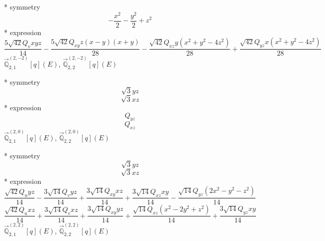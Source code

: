 \documentclass[fleqn,8pt]{jsarticle}
\begin{document}
\noindent\quad ** symmetry
\begin{dmath*}
- \frac{x^{2}}{2} - \frac{y^{2}}{2} + z^{2}
\end{dmath*}
\noindent\quad ** expression
\begin{dmath*}
\frac{5 \sqrt{42} Q_{v} x y z}{14} - \frac{5 \sqrt{42} Q_{xy} z \left(x - y\right) \left(x + y\right)}{28} - \frac{\sqrt{42} Q_{xz} y \left(x^{2} + y^{2} - 4 z^{2}\right)}{28} + \frac{\sqrt{42} Q_{yz} x \left(x^{2} + y^{2} - 4 z^{2}\right)}{28}
\end{dmath*}
\noindent\quad $\vec{\mathbb{Q}}_{2,1}^{(2,-2)}[q](E)$, $\vec{\mathbb{Q}}_{2,2}^{(2,-2)}[q](E)$

\noindent\quad ** symmetry
\begin{dmath*}
\sqrt{3} y z
\end{dmath*}
\begin{dmath*}
\sqrt{3} x z
\end{dmath*}
\noindent\quad ** expression
\begin{dmath*}
Q_{yz}
\end{dmath*}
\begin{dmath*}
Q_{xz}
\end{dmath*}
\noindent\quad $\vec{\mathbb{Q}}_{2,1}^{(2,0)}[q](E)$, $\vec{\mathbb{Q}}_{2,2}^{(2,0)}[q](E)$

\noindent\quad ** symmetry
\begin{dmath*}
\sqrt{3} y z
\end{dmath*}
\begin{dmath*}
\sqrt{3} x z
\end{dmath*}
\noindent\quad ** expression
\begin{dmath*}
\frac{\sqrt{42} Q_{u} y z}{14} - \frac{3 \sqrt{14} Q_{v} y z}{14} + \frac{3 \sqrt{14} Q_{xy} x z}{14} + \frac{3 \sqrt{14} Q_{xz} x y}{14} - \frac{\sqrt{14} Q_{yz} \left(2 x^{2} - y^{2} - z^{2}\right)}{14}
\end{dmath*}
\begin{dmath*}
\frac{\sqrt{42} Q_{u} x z}{14} + \frac{3 \sqrt{14} Q_{v} x z}{14} + \frac{3 \sqrt{14} Q_{xy} y z}{14} + \frac{\sqrt{14} Q_{xz} \left(x^{2} - 2 y^{2} + z^{2}\right)}{14} + \frac{3 \sqrt{14} Q_{yz} x y}{14}
\end{dmath*}
\noindent\quad $\vec{\mathbb{Q}}_{2,1}^{(2,2)}[q](E)$, $\vec{\mathbb{Q}}_{2,2}^{(2,2)}[q](E)$
\end{document}
